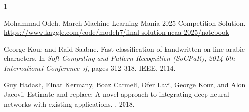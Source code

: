 \documentclass{article}
\begin{document}
  


\begin{thebibliography}{1}

Mohammad Odeh.
\newblock March Machine Learning Mania 2025 Competition Solution.
\newblock \url{https://www.kaggle.com/code/modeh7/final-solution-ncaa-2025/notebook}

George Kour and Raid Saabne.
\newblock Fast classification of handwritten on-line arabic characters.
\newblock In {\em Soft Computing and Pattern Recognition (SoCPaR), 2014 6th
  International Conference of}, pages 312--318. IEEE, 2014.

Guy Hadash, Einat Kermany, Boaz Carmeli, Ofer Lavi, George Kour, and Alon
  Jacovi.
\newblock Estimate and replace: A novel approach to integrating deep neural
  networks with existing applications.
, 2018.

\end{thebibliography}
\end{document}
